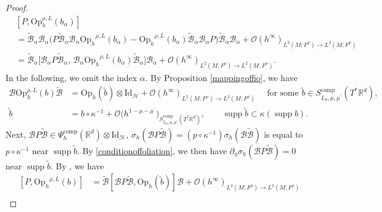 \documentclass[11pt,oneside,reqno]{amsart}
\newcommand\Oph{\ensuremath{\mathrm{Op}_h}}
\theoremstyle{definition}
\numberwithin{equation}{section}
\theoremstyle{plain}
\begin{document}
\begin{proof}
\begin{equation}
\begin{aligned}
&{\left[P, \mathrm{Op}_h^{\rho,L}(b_{\alpha})\right] } \\
& =\widetilde{\mathcal{B}}_{\alpha} \mathcal{B}_{\alpha}\Big(P \widetilde{\mathcal{B}}_{\alpha} \mathcal{B}_{\alpha} \Oph^{\rho,L}(b_{\alpha})-\Oph^{\rho,L}(b_{\alpha}) \widetilde{\mathcal{B}}_{\alpha} \mathcal{B}_{\alpha} P\Big) \widetilde{\mathcal{B}}_{\alpha} \mathcal{B}_{\alpha}+\mathcal{O}(h^{\infty})_{L^2(M;F^\rho) \rightarrow L^2(M;F^\rho)} \\
& =\widetilde{\mathcal{B}}_{\alpha}\Big[\mathcal{B}_{\alpha} P \widetilde{\mathcal{B}}_{\alpha} ,\, \mathcal{B}_{\alpha} \Oph^{\rho,L}(b_{\alpha}) \widetilde{\mathcal{B}}_{\alpha}\Big] \mathcal{B}_{\alpha}+\mathcal{O}(h^{\infty})_{L^2(M;F^\rho) \rightarrow L^2(M;F^\rho)}.
\end{aligned}
\end{equation}
In the following, we omit the index $\alpha$. By Proposition \ref{mappingoffio}, we have
\begin{equation}
\begin{aligned}
\mathcal{B} \mathrm{Op}_h^{\rho,L}(b) \widetilde{\mathcal{B}}& =\mathrm{Op}_h(\widetilde{b})\otimes \mathrm{Id}_{\mathcal{H}}+\mathcal{O}(h^{\infty})_{L^2(M;F^\rho) \rightarrow L^2(M;F^\rho)} \quad \text { for some } \widetilde{b} \in S_{L_0, \mu, \mu^{\prime}}^{\mathrm{comp}}(T^* \mathbb{R}^d) ,\\
\widetilde{b}&=b \circ \kappa^{-1}+\mathcal{O}\big(h^{1-\mu-\mu^{\prime}} \big)_{S_{L_0, \mu, \mu^{\prime}}^{\mathrm{comp}}(T^* \mathbb{R}^d)}, \qquad \operatorname{supp} \widetilde{b} \subset \kappa(\operatorname{supp} b).
\end{aligned}
\end{equation}
Next, $\mathcal{B} P \widetilde{\mathcal{B}} \in \Psi^{\mathrm{comp}}_h(\mathbb{R}^d)\otimes \mathrm{Id}_{\mathcal{H}}$, $\sigma_h(\mathcal{B} P \widetilde{\mathcal{B}})=(p \circ \kappa^{-1}) \sigma_h(\mathcal{B} \widetilde{\mathcal{B}})$ is equal to $p \circ \kappa^{-1}$ near $\operatorname{supp} \widetilde{b}$. By \eqref{conditionoffoliation}, we then have $\partial_\eta \sigma_h(\mathcal{B} P \widetilde{\mathcal{B}})=0$ near $\operatorname{supp} \widetilde{b}$. By \cite[(A.13)]{dyatlov2018semiclassical}, we have
\begin{equation}\label{commuatorformula}
\begin{aligned}
{\left[P, \Oph^{\rho,L}(b)\right] } & =\widetilde{\mathcal{B}}\left[\mathcal{B} P \widetilde{\mathcal{B}}, \mathrm{Op}_h(\widetilde{b})\right] \mathcal{B}+\mathcal{O}(h^{\infty})_{L^2(M;F^\rho) \rightarrow L^2(M;F^\rho)} \\

\end{aligned}
\end{equation}
\end{proof}
\end{document}
